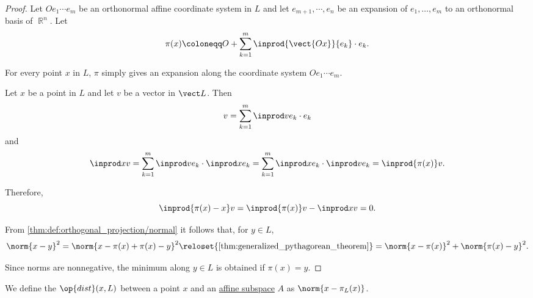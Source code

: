 \begin{proof}
  Let \( O e_1 \cdots e_m \) be an orthonormal affine coordinate system in \( L \) and let \( e_{m+1}, \cdots, e_n \) be an expansion of \( e_1, \ldots, e_m \) to an orthonormal basis of \( \BbbR^n \). Let
  \begin{equation*}
    \pi(x) \coloneqq O + \sum_{k=1}^m \inprod {\vect{Ox}} {e_k} \cdot e_k.
  \end{equation*}

   For every point \( x \) in \( L \), \( \pi \) simply gives an expansion along the coordinate system \( O e_1 \cdots e_m \).

   Let \( x \) be a point in \( L \) and let \( v \) be a vector in \( \vect L \). Then
  \begin{equation*}
    v = \sum_{k=1}^m \inprod v {e_k} \cdot e_k
  \end{equation*}
  and
  \begin{equation*}
    \inprod x v
    =
    \sum_{k=1}^m \inprod v {e_k} \cdot \inprod x {e_k}
    =
    \sum_{k=1}^m \inprod x {e_k} \cdot \inprod v {e_k}
    =
    \inprod {\pi(x)} v.
  \end{equation*}

  Therefore,
  \begin{equation*}
    \inprod {\pi(x) - x} v
    =
    \inprod {\pi(x)} v - \inprod x v
    =
    0.
  \end{equation*}

   From \cref{thm:def:orthogonal_projection/normal} it follows that, for \( y \in L \),
  \begin{equation*}
    \norm{ x - y }^2
    =
    \norm{ x - \pi(x) + \pi(x) - y }^2
    \reloset {\ref{thm:generalized_pythagorean_theorem}} =
    \norm{ x - \pi(x) }^2 + \norm{ \pi(x) - y }^2.
  \end{equation*}

  Since norms are nonnegative, the minimum along \( y \in L \) is obtained if \( \pi(x) = y \).
\end{proof}

\begin{definition}\label{def:distance_to_subspace}
  We define the  \( \op{dist}(x, L) \) between a point \( x \) and an \hyperref[def:affine_subspace]{affine subspace} \( A \) as \( \norm{ x - \pi_L(x) } \).
\end{definition}

